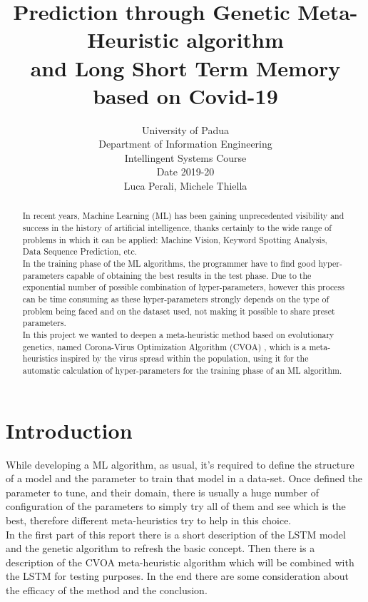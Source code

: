 \documentclass[letterpaper]{article}%
\title{Prediction through Genetic Meta-Heuristic algorithm \\ and Long Short Term Memory based on Covid-19}
\author{ University of Padua \\ Department of Information Engineering \\ Intellingent Systems Course \\ Date 2019-20 \\ %
Luca Perali, Michele Thiella
}
\begin{document}
\maketitle

\begin{abstract}
	In recent years, Machine Learning (ML) has been gaining unprecedented visibility and success in the history of artificial intelligence, thanks certainly to the wide range of problems in which it can be applied: Machine Vision, Keyword Spotting Analysis, Data Sequence Prediction, etc. \\
	In the training phase of the ML algorithms, the programmer have to find good hyper-parameters capable of obtaining the best results in the test phase. Due to the exponential number of possible combination of hyper-parameters, however this process can be time consuming as these hyper-parameters strongly depends on the type of problem being faced and on the dataset used, not making it possible to share preset parameters. \\
	In this project we wanted to deepen a meta-heuristic method based on evolutionary genetics, named Corona-Virus Optimization Algorithm (CVOA) \cite{martnezlvarez2020coronavirus}, which is a meta-heuristics inspired by the virus spread within the population, using it for the automatic calculation of hyper-parameters for the training phase of an ML algorithm.
\end{abstract}

\section{Introduction}
	While developing a ML algorithm, as usual, it's required to define the structure of a model and the parameter to train that model in a data-set. Once defined the parameter to tune, and their domain, there is usually a huge number of configuration of the parameters to simply try all of them and see which is the best, therefore different meta-heuristics try to help in this choice.\\
	In the first part of this report there is a short description of the LSTM model and the genetic algorithm to refresh the basic concept. Then there is a description of the CVOA meta-heuristic algorithm which will be combined with the LSTM for testing purposes. In the end there are some consideration about the efficacy of the method and the conclusion.
\end{document}
